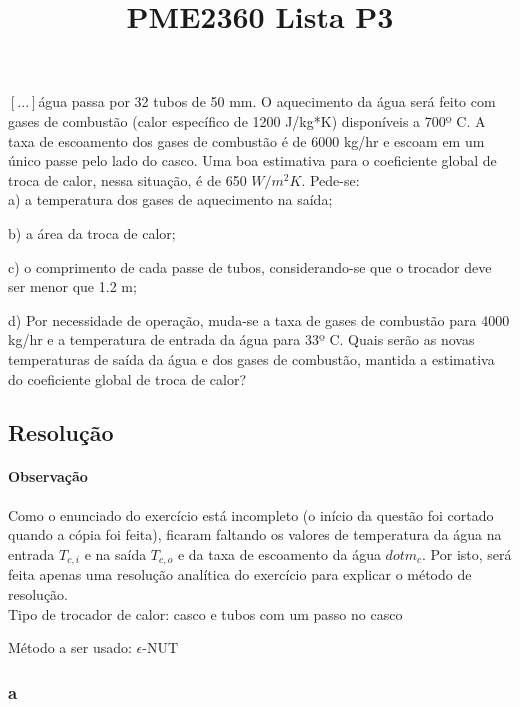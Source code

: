 \documentclass[a4paper, 12pt]{article}
\title{PME2360 Lista P3}
\begin{document}
\maketitle

\section{}

$[...]$água passa por 32 tubos de 50 mm. O aquecimento da água será feito com gases de combustão (calor específico de 1200 J/kg*K) disponíveis a 700º C. A taxa de escoamento dos gases de combustão é de 6000 kg/hr e escoam em um único passe pelo lado do casco. Uma boa estimativa para o coeficiente global de troca de calor, nessa situação, é de 650 $W/m^{2}K$. Pede-se:
\\

a) a temperatura dos gases de aquecimento na saída;

b) a área da troca de calor;

c) o comprimento de cada passe de tubos, considerando-se que o trocador deve ser menor que 1.2 m; 

d) Por necessidade de operação, muda-se a taxa de gases de combustão para 4000 kg/hr e a temperatura de entrada da água para 33º C. Quais serão as novas temperaturas de saída da água e dos gases de combustão, mantida a estimativa do coeficiente global de troca de calor?\\

\subsection{Resolução}

\paragraph{Observação} Como o enunciado do exercício está incompleto (o início da questão foi cortado quando a cópia foi feita), ficaram faltando os valores de temperatura da água na entrada $T_{c,i}$ e na saída $T_{c,o}$ e da taxa de escoamento da água $dot{m}_{c}$. Por isto, será feita apenas uma resolução analítica do exercício para explicar o método de resolução.\\

Tipo de trocador de calor: casco e tubos com um passo no casco

Método a ser usado: $\epsilon$-NUT

\subsubsection{a}
\end{document}
